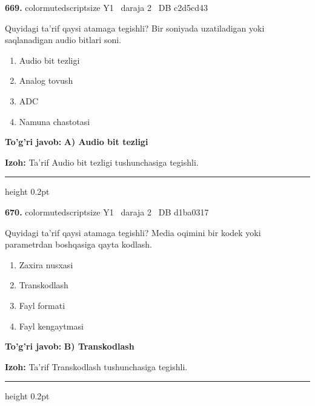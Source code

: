 \documentclass[10pt,a4paper,oneside]{article}
\begin{document}
\noindent\textbf{\color{ink}669.}  {color{muted}scriptsize Y1 \textbullet\ daraja 2 \textbullet\ DB c2d5cd43}
\par
Quyidagi ta'rif qaysi atamaga tegishli? Bir soniyada uzatiladigan yoki saqlanadigan audio bitlari soni.
\begin{enumerate}[label=\Alph*),leftmargin=9mm]
\item Audio bit tezligi
\item Analog tovush
\item ADC
\item Namuna chastotasi
\end{enumerate}
\begin{tcolorbox}[enhanced,breakable,colback=teal!4,colframe=teal!50!black,boxrule=0.5pt,arc=1.1mm,left=3mm,right=3mm,top=1.7mm,bottom=1.7mm,before skip=2mm,after skip=2mm]
\textbf{\color{teal}To'g'ri javob:} \textbf{A) Audio bit tezligi}
\par\smallskip
\textbf{Izoh:} Ta'rif Audio bit tezligi tushunchasiga tegishli.
\end{tcolorbox}
\vspace{2mm}\hrule height 0.2pt \vspace{3mm}

\noindent\textbf{\color{ink}670.}  {color{muted}scriptsize Y1 \textbullet\ daraja 2 \textbullet\ DB d1ba0317}
\par
Quyidagi ta'rif qaysi atamaga tegishli? Media oqimini bir kodek yoki parametrdan boshqasiga qayta kodlash.
\begin{enumerate}[label=\Alph*),leftmargin=9mm]
\item Zaxira nusxasi
\item Transkodlash
\item Fayl formati
\item Fayl kengaytmasi
\end{enumerate}
\begin{tcolorbox}[enhanced,breakable,colback=teal!4,colframe=teal!50!black,boxrule=0.5pt,arc=1.1mm,left=3mm,right=3mm,top=1.7mm,bottom=1.7mm,before skip=2mm,after skip=2mm]
\textbf{\color{teal}To'g'ri javob:} \textbf{B) Transkodlash}
\par\smallskip
\textbf{Izoh:} Ta'rif Transkodlash tushunchasiga tegishli.
\end{tcolorbox}
\vspace{2mm}\hrule height 0.2pt \vspace{3mm}
\end{document}
